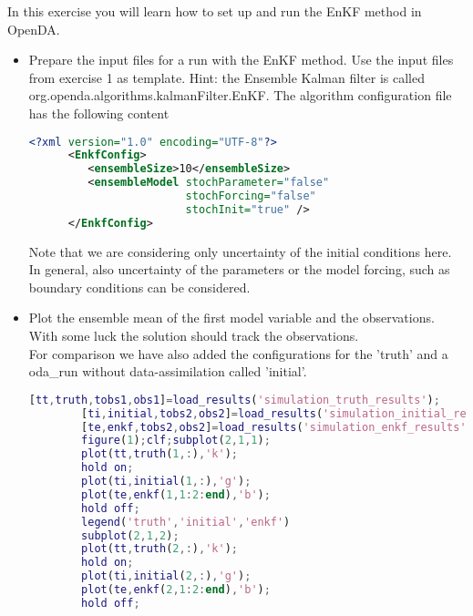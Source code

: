 
In this exercise you will learn how to set up and run the EnKF method in OpenDA.

\begin{itemize}
  \item Prepare the input files for a run with the EnKF method. Use the input
        files from exercise 1 as template. Hint: the Ensemble Kalman filter
        is called org.openda.algorithms.kalmanFilter.EnKF. The algorithm
        configuration file has the following content
      \begin{lstlisting}[language=XML,frame=single,caption={XML-input for EnKF algorithm}]
      <?xml version="1.0" encoding="UTF-8"?>
      <EnkfConfig>
         <ensembleSize>10</ensembleSize>
         <ensembleModel stochParameter="false"
                        stochForcing="false"
                        stochInit="true" />
      </EnkfConfig>
      \end{lstlisting}
      Note that we are considering only uncertainty of the initial conditions here. In general, also uncertainty of the 
      parameters or the model forcing, such as boundary conditions can be considered.

  \item Plot the ensemble mean of the first model variable and the observations.
        With some luck the solution should track the observations. \\
        For comparison we have also added the configurations for the 'truth' and a oda\_run
        without data-assimilation called 'initial'.
        
        \begin{lstlisting}[language=Matlab,frame=single,caption={Matlab}]
        [tt,truth,tobs1,obs1]=load_results('simulation_truth_results');
        [ti,initial,tobs2,obs2]=load_results('simulation_initial_results');
        [te,enkf,tobs2,obs2]=load_results('simulation_enkf_results');
        figure(1);clf;subplot(2,1,1);
        plot(tt,truth(1,:),'k');
        hold on;
        plot(ti,initial(1,:),'g');
        plot(te,enkf(1,1:2:end),'b');
        hold off;
        legend('truth','initial','enkf')
        subplot(2,1,2);
        plot(tt,truth(2,:),'k');
        hold on;
        plot(ti,initial(2,:),'g');
        plot(te,enkf(2,1:2:end),'b');
        hold off;
        \end{lstlisting}


\end{itemize}
